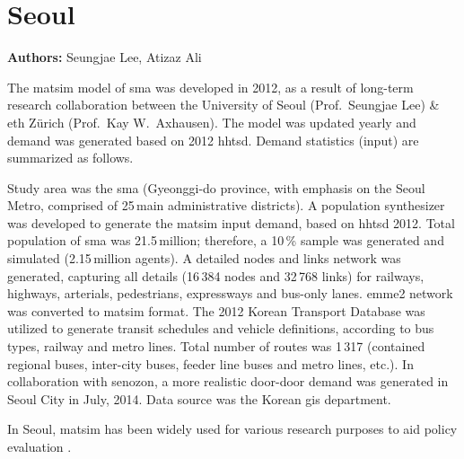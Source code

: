 \section{Seoul}
\label{sec:seoul}
\hfill \textbf{Authors:} Seungjae Lee, Atizaz Ali


The \gls{matsim} model of \gls{sma} was developed in 2012, as a result of long-term research collaboration between the University of Seoul (Prof.\ Seungjae Lee) \& \gls{eth} Zürich (Prof.\ Kay W.\ Axhausen). The model was updated yearly and demand was generated based on 2012 \gls{hhtsd}. Demand statistics (input) are summarized as follows. 

Study area was the \gls{sma} (Gyeonggi-do province, with emphasis on the Seoul Metro,  comprised of 25\,main administrative districts). A population synthesizer was developed to generate the \gls{matsim} input demand, based on \gls{hhtsd} 2012. Total population of \gls{sma} was 21.5\,million; therefore, a 10\,\% sample was generated and simulated (2.15\,million agents). A detailed nodes and links network was generated, capturing all details (16\,384 nodes and 32\,768 links) for railways, highways, arterials, pedestrians, expressways and bus-only lanes. \gls{emme2} network was converted to \gls{matsim} format. The 2012 Korean Transport Database was utilized to generate transit schedules and vehicle definitions, according to bus types, railway and metro lines. Total number of routes was 1\,317 (contained regional buses, inter-city buses, feeder line buses and metro lines, etc.). In collaboration with \gls{senozon}, a more realistic door-door demand was generated in Seoul City in July, 2014. Data source was the Korean \gls{gis} department.

In Seoul, \gls{matsim} has been widely used for various research purposes to aid policy evaluation \citet[e.g.,][]{KimEtAl_IJHE_2012, LeeAli_unpub_IWUTSCD_2014}.

